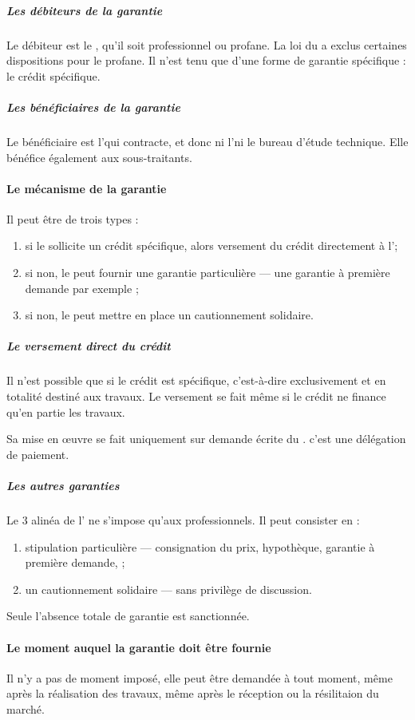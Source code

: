 					\subparagraph{Les débiteurs de la garantie} Le débiteur est le \Mo, qu'il soit professionnel ou profane. La loi du  a exclus certaines dispositions pour le \Mo profane. Il n'est tenu que d'une forme de garantie spécifique : le crédit spécifique.

					\subparagraph{Les bénéficiaires de la garantie} Le bénéficiaire est l'\E qui contracte, et donc ni l'\archi ni le bureau d'étude technique. Elle bénéfice également aux sous-traitants.

				\paragraph{Le mécanisme de la garantie}

					Il peut être de trois types :
					\begin{enumerate}
						\item si le \Mo sollicite un crédit spécifique, alors versement du crédit directement à l'\E ;
						\item si non, le \Mo peut fournir une garantie particulière --- une garantie à première demande par exemple ;
						\item si non, le \Mo peut mettre en place un cautionnement solidaire.
					\end{enumerate}

					\subparagraph{Le versement direct du crédit} Il n'est possible que si le crédit est spécifique, c'est-à-dire exclusivement et en totalité destiné aux travaux. Le versement se fait même si le crédit ne finance qu'en partie les travaux.

					Sa mise en œuvre se fait uniquement sur demande écrite du \Mo. c'est une délégation de paiement.

					\subparagraph{Les autres garanties}

					Le 3\ieme{} alinéa de l' ne s'impose qu'aux professionnels. Il peut consister en :
					\begin{enumerate}
						\item stipulation particulière --- consignation du prix, hypothèque, garantie à première demande, \etc ;
						\item un cautionnement solidaire --- sans privilège de discussion.
					\end{enumerate}

					Seule l'absence totale de garantie est sanctionnée.

				\paragraph{Le moment auquel la garantie doit être fournie} Il n'y a pas de moment imposé, elle peut être demandée à tout moment, même après la réalisation des travaux, même après le réception ou la résilitaion du marché.


